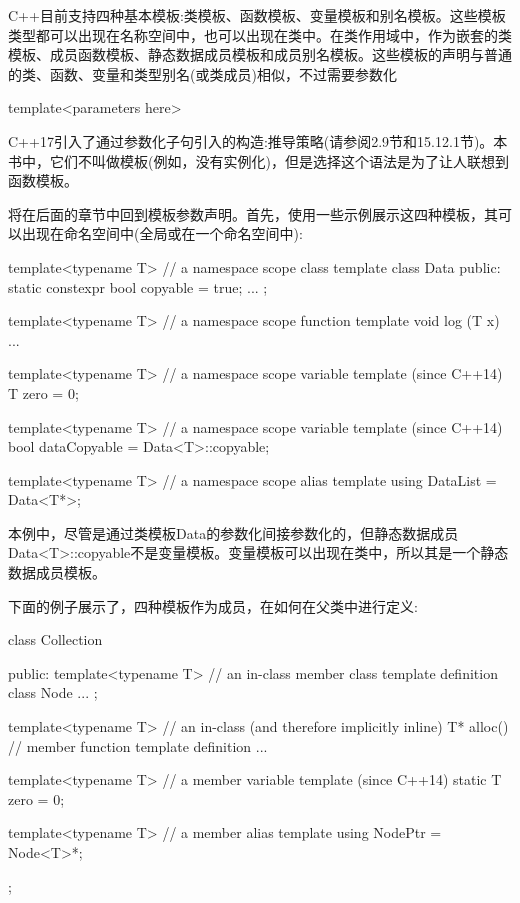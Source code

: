 
C++目前支持四种基本模板:类模板、函数模板、变量模板和别名模板。这些模板类型都可以出现在名称空间中，也可以出现在类中。在类作用域中，作为嵌套的类模板、成员函数模板、静态数据成员模板和成员别名模板。这些模板的声明与普通的类、函数、变量和类型别名(或类成员)相似，不过需要参数化

\begin{cpp}
template<parameters here>
\end{cpp}

C++17引入了通过参数化子句引入的构造:推导策略(请参阅2.9节和15.12.1节)。本书中，它们不叫做模板(例如，没有实例化)，但是选择这个语法是为了让人联想到函数模板。

将在后面的章节中回到模板参数声明。首先，使用一些示例展示这四种模板，其可以出现在命名空间中(全局或在一个命名空间中):

\begin{cpp}
template<typename T> // a namespace scope class template
class Data {
	public:
	static constexpr bool copyable = true;
	...
};

template<typename T> // a namespace scope function template
void log (T x) {
	...
}

template<typename T> // a namespace scope variable template (since C++14)
T zero = 0;

template<typename T> // a namespace scope variable template (since C++14)
bool dataCopyable = Data<T>::copyable;

template<typename T> // a namespace scope alias template
using DataList = Data<T*>;
\end{cpp}

本例中，尽管是通过类模板Data的参数化间接参数化的，但静态数据成员Data<T>::copyable不是变量模板。变量模板可以出现在类中，所以其是一个静态数据成员模板。

下面的例子展示了，四种模板作为成员，在如何在父类中进行定义:

\begin{cpp}
class Collection {
	public:
	template<typename T> // an in-class member class template definition
	class Node {
		...
	};

	template<typename T> // an in-class (and therefore implicitly inline)
	T* alloc() { // member function template definition
		...
	}

	template<typename T> // a member variable template (since C++14)
	static T zero = 0;
	
	template<typename T> // a member alias template
	using NodePtr = Node<T>*;
};
\end{cpp}

